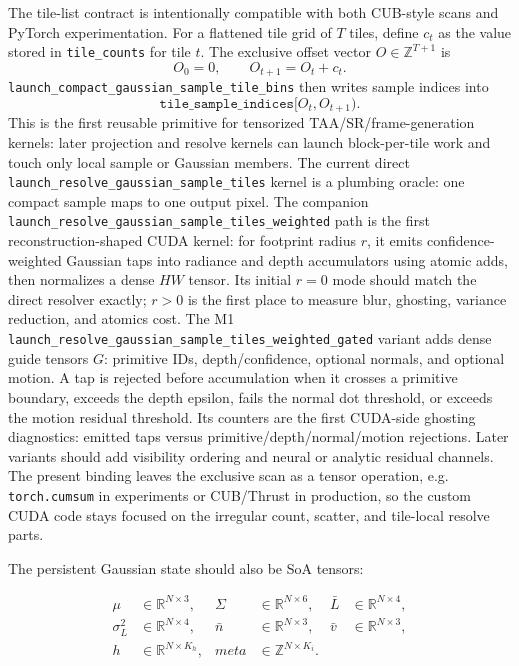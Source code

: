 \documentclass[11pt]{article}
\begin{document}
The tile-list contract is intentionally compatible with both CUB-style scans
and PyTorch experimentation. For a flattened tile grid of $T$ tiles, define
$c_t$ as the value stored in \texttt{tile\_counts} for tile $t$. The exclusive
offset vector $O\in \mathbb{Z}^{T+1}$ is
\[
  O_0=0,\qquad O_{t+1}=O_t+c_t .
\]
\texttt{launch\_compact\_gaussian\_sample\_tile\_bins} then writes sample
indices into
\[
  \texttt{tile\_sample\_indices}[O_t, O_{t+1}) .
\]
This is the first reusable primitive for tensorized TAA/SR/frame-generation
kernels: later projection and resolve kernels can launch block-per-tile work
and touch only local sample or Gaussian members. The current direct
\texttt{launch\_resolve\_gaussian\_sample\_tiles} kernel is a plumbing oracle:
one compact sample maps to one output pixel. The companion
\texttt{launch\_resolve\_gaussian\_sample\_tiles\_weighted} path is the first
reconstruction-shaped CUDA kernel: for footprint radius $r$, it emits
confidence-weighted Gaussian taps into radiance and depth accumulators using
atomic adds, then normalizes a dense $HW$ tensor. Its initial $r=0$ mode should
match the direct resolver exactly; $r>0$ is the first place to measure blur,
ghosting, variance reduction, and atomics cost. The M1
\texttt{launch\_resolve\_gaussian\_sample\_tiles\_weighted\_gated} variant adds
dense guide tensors $G$: primitive IDs, depth/confidence, optional normals, and
optional motion. A tap is rejected before accumulation when it crosses a
primitive boundary, exceeds the depth epsilon, fails the normal dot threshold, or
exceeds the motion residual threshold. Its counters are the first CUDA-side
ghosting diagnostics: emitted taps versus primitive/depth/normal/motion
rejections. Later variants should add visibility ordering and neural or analytic
residual channels. The present binding leaves the exclusive scan as a tensor
operation, e.g. \texttt{torch.cumsum} in experiments or CUB/Thrust in
production, so the custom CUDA code stays focused on the irregular count,
scatter, and tile-local resolve parts.

The persistent Gaussian state should also be SoA tensors:

\[
\begin{aligned}
  \mu       &\in \mathbb{R}^{N\times 3}, &
  \Sigma   &\in \mathbb{R}^{N\times 6}, &
  \bar L   &\in \mathbb{R}^{N\times 4},\\
  \sigma_L^2 &\in \mathbb{R}^{N\times 4}, &
  \bar n   &\in \mathbb{R}^{N\times 3}, &
  \bar v   &\in \mathbb{R}^{N\times 3},\\
  h        &\in \mathbb{R}^{N\times K_h}, &
  meta     &\in \mathbb{Z}^{N\times K_i}. &
\end{aligned}
\]
\end{document}
